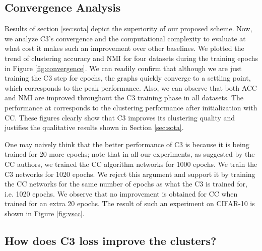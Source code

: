 \documentclass{bmvc2k}
\newcommand{\shadow}[1]{}
\def\s{\shadow}
\begin{document}
\subsection{Convergence Analysis}

Results of section \ref{sec:sota} depict the superiority of our proposed scheme. Now, we analyze C3's convergence and the computational complexity to evaluate at what cost it makes such an improvement over other baselines. We plotted the trend of clustering accuracy and NMI for four datasets during the training epochs in Figure \ref{fig:convergence}. We can readily confirm that although we are just training the C3 step for  epochs, the graphs quickly converge to a settling point, which corresponds to the peak performance. Also, we can observe that both ACC and NMI are improved throughout the C3 training phase in all datasets. The performance at  corresponds to the clustering performance after initialization with CC\s{final performance of the CC algorithm}. These figures clearly show that C3 improves its clustering quality and justifies the qualitative results shown in Section \ref{sec:sota}.


One may naively \s{(wrongly)}think that the better performance of C3 \s{compared to CC} is because it is being trained for 20 more epochs; note that in all our experiments, as suggested by the CC authors,  we trained the CC algorithm networks for 1000 epochs. We train the C3 networks for 1020 epochs.\s{i.e. 1000 epochs for the first step and 20 epochs for the second step.} We reject this argument and support it by training the CC networks for the same number of epochs as what the C3 is trained for, i.e. 1020 epochs. We observe that no improvement is obtained for CC when trained for an extra 20 epochs. \s{This is while when we keep training the networks with the C3 loss for only 20 more epochs, significant improvements are observed. This shows that the superior performance of C3 is not because of the extra  epochs but because its objective function helps the network discover patterns that are complementary to those that CC extracts.} The result of such an experiment on CIFAR-10 is shown in Figure \ref{fig:vscc}.

\subsection{How does C3 loss improve the clusters?}
\label{sec:improve}
\end{document}
